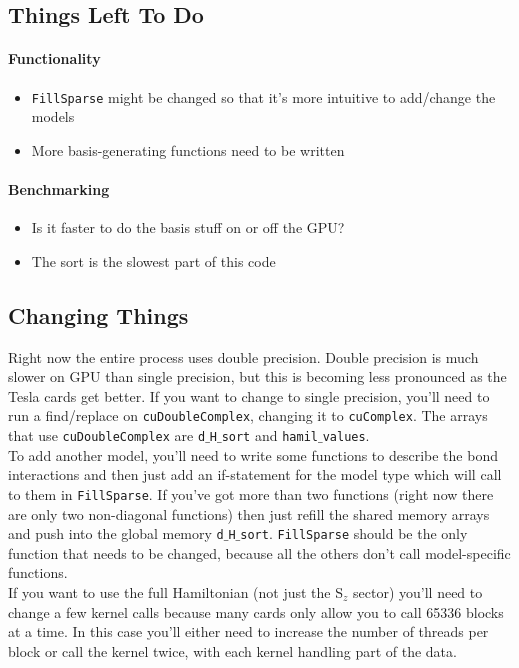 \documentclass{article}
\begin{document}
\subsection{Things Left To Do}
\paragraph{Functionality}
\begin{itemize}
\item{\texttt{FillSparse} might be changed so that it's more intuitive to add/change the models}
\item{More basis-generating functions need to be written}
\end{itemize}
\paragraph{Benchmarking}
\begin{itemize}
\item{Is it faster to do the basis stuff on or off the GPU?}
\item{The sort is the slowest part of this code}
\end{itemize}

\subsection{Changing Things}
Right now the entire process uses double precision. 
Double precision is much slower on GPU than single precision, but this is becoming less pronounced as the Tesla cards get better. 
If you want to change to single precision, you'll need to run a find/replace on \texttt{cuDoubleComplex}, changing it to \texttt{cuComplex}. 
The arrays that use \texttt{cuDoubleComplex} are \texttt{d$\_$H$\_$sort} and \texttt{hamil$\_$values}.\\ 
To add another model, you'll need to write some functions to describe the bond interactions and then just add an if-statement for the model type which will call to them in \texttt{FillSparse}. 
If you've got more than two functions (right now there are only two non-diagonal functions) then just refill the shared memory arrays and push into the global memory \texttt{d$\_$H$\_$sort}. 
\texttt{FillSparse} should be the only function that needs to be changed, because all the others don't call model-specific functions.\\
If you want to use the full Hamiltonian (not just the S$_z$ sector) you'll need to change a few kernel calls because many cards only allow you to call 65336 blocks at a time. 
In this case you'll either need to increase the number of threads per block or call the kernel twice, with each kernel handling part of the data. 
 
\end{document}
